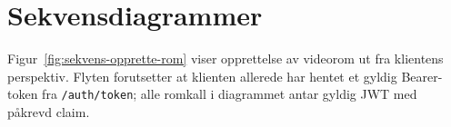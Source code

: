\section{Sekvensdiagrammer}
\label{sec:sekvensdiagram}

Figur~\ref{fig:sekvens-opprette-rom} viser opprettelse av videorom ut fra klientens
perspektiv. Flyten forutsetter at klienten allerede har hentet et gyldig
Bearer-token fra \texttt{/auth/token}; alle romkall i diagrammet antar gyldig JWT med
påkrevd claim.


